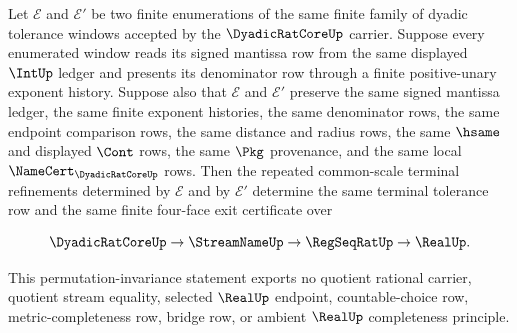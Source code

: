 \begin{theorem}
\label{thm:dyadicratcore-common-scale-terminal-refinement-permutation-invariance}
Let $\mathcal{E}$ and $\mathcal{E}'$ be two finite enumerations of the same finite family of dyadic tolerance windows accepted by the $\DyadicRatCoreUp$ carrier. Suppose every enumerated window reads its signed mantissa row from the same displayed $\IntUp$ ledger and presents its denominator row through a finite positive-unary exponent history. Suppose also that $\mathcal{E}$ and $\mathcal{E}'$ preserve the same signed mantissa ledger, the same finite exponent histories, the same denominator rows, the same endpoint comparison rows, the same distance and radius rows, the same $\hsame$ and displayed $\Cont$ rows, the same $\Pkg$ provenance, and the same local $\NameCert_{\DyadicRatCoreUp}$ rows. Then the repeated common-scale terminal refinements determined by $\mathcal{E}$ and by $\mathcal{E}'$ determine the same terminal tolerance row and the same finite four-face exit certificate over

$$
\DyadicRatCoreUp \to \StreamNameUp \to \RegSeqRatUp \to \RealUp .
$$

This permutation-invariance statement exports no quotient rational carrier, quotient stream equality, selected $\RealUp$ endpoint, countable-choice row, metric-completeness row, bridge row, or ambient $\RealUp$ completeness principle.
\end{theorem}

